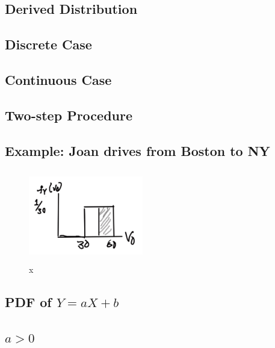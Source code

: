 \documentclass{article}
\begin{document}
\subsection{Derived Distribution}


\subsection{Discrete Case}


\subsection{Continuous Case}


\subsection{Two-step Procedure}


\subsection{Example: Joan drives from Boston to NY}


\begin{figure}[h]
\centering
\includegraphics[width=5cm, height=4cm]{images/L10/joan_drives.jpeg}
\caption{x}
\end{figure}

\subsection{PDF of \texorpdfstring{$Y=aX + b$}{Y} }


\subsection{\texorpdfstring{$a > 0$}{a}}
\end{document}
